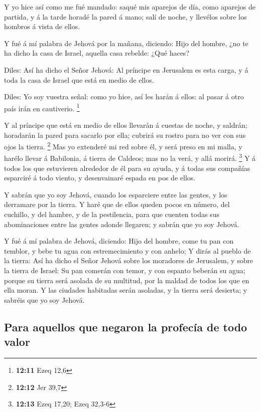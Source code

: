  Y yo hice así como me fué mandado: saqué mis aparejos de
día, como aparejos de partida, y á la tarde horadé la pared á mano; salí
de noche, y llevélos sobre los hombros á vista de ellos.

 Y fué á mí palabra de Jehová por la mañana, diciendo:
 Hijo del hombre, ¿no te ha dicho la casa de Israel,
aquella casa rebelde: ¿Qué haces?

 Diles: Así ha dicho el Señor Jehová: Al príncipe en
Jerusalem es esta carga, y á toda la casa de Israel que está en medio de
ellos.

 Diles: Yo soy vuestra señal: como yo hice, así les harán
á ellos: al pasar á otro país irán en cautiverio. \footnote{\textbf{12:11}
  Ezeq 12,6}

 Y al príncipe que está en medio de ellos llevarán á
cuestas de noche, y saldrán; horadarán la pared para sacarlo por ella;
cubrirá su rostro para no ver con sus ojos la tierra. \footnote{\textbf{12:12}
  Jer 39,7}  Mas yo extenderé mi red sobre él, y será
preso en mi malla, y harélo llevar á Babilonia, á tierra de Caldeos; mas
no la verá, y allá morirá. \footnote{\textbf{12:13} Ezeq 17,20; Ezeq
  32,3-6}  Y á todos los que estuvieren alrededor de él
para su ayuda, y á todas sus compañías esparciré á todo viento, y
desenvainaré espada en pos de ellos.

 Y sabrán que yo soy Jehová, cuando los esparciere entre
las gentes, y los derramare por la tierra.  Y haré que de
ellos queden pocos en número, del cuchillo, y del hambre, y de la
pestilencia, para que cuenten todas sus abominaciones entre las gentes
adonde llegaren; y sabrán que yo soy Jehová.

 Y fué á mí palabra de Jehová, diciendo: 
Hijo del hombre, come tu pan con temblor, y bebe tu agua con
estremecimiento y con anhelo;  Y dirás al pueblo de la
tierra: Así ha dicho el Señor Jehová sobre los moradores de Jerusalem, y
sobre la tierra de Israel: Su pan comerán con temor, y con espanto
beberán su agua; porque su tierra será asolada de su multitud, por la
maldad de todos los que en ella moran.  Y las ciudades
habitadas serán asoladas, y la tierra será desierta; y sabréis que yo
soy Jehová.

\hypertarget{para-aquellos-que-negaron-la-profecuxeda-de-todo-valor}{%
\subsection{Para aquellos que negaron la profecía de todo
valor}\label{para-aquellos-que-negaron-la-profecuxeda-de-todo-valor}}

